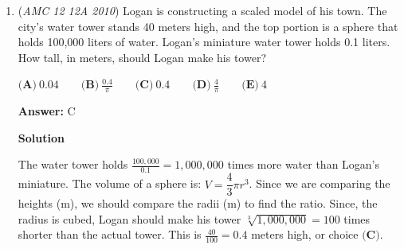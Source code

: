 \begin{enumerate}
 \textbf{Answer: }E



\textbf{Solution 1}

$x$ is at most $999$, so $x+32$ is at most $1031$. The minimum value of $x+32$ is $1000$. However, the only palindrome between $1000$ and $1032$ is $1001$, which means that $x+32$ must be $1001$.

 It follows that $x$ is $969$, so the sum of the digits is $\boxed{\textbf{(E)}\ 24}$.

 



\textbf{Solution 2}

For $x+32$ to be a four-digit number, $x$ is in between $968$ and $999$. The palindromes in this range are $969$, $979$, $989$, and $999$, so the sum of the digits of $x$ can be $24$, $25$, $26$, or $27$. Only $\boxed{\textbf{(E)}\ 24}$ is an option, and upon checking, $x+32=1001$ is indeed a palindrome.

 



\textbf{Solution 3}

Since we know $x+32$ to be $1 a a 1$ and the only palindrome that works is $0 = a$, that means $x+32 = 1001$, and so $x = 1001 - 32 = 969$. So, $9$ + $6$ + $9$ = $\boxed{\textbf{(E)}\ 24}$.~songmath20

 


	\item (\textit{AMC 12 12A 2010}) Logan is constructing a scaled model of his town. The city's water tower stands 40 meters high, and the top portion is a sphere that holds 100,000 liters of water. Logan's miniature water tower holds 0.1 liters. How tall, in meters, should Logan make his tower?


 $\textbf{(A)}\ 0.04 \qquad \textbf{(B)}\ \frac{0.4}{\pi} \qquad \textbf{(C)}\ 0.4 \qquad \textbf{(D)}\ \frac{4}{\pi} \qquad \textbf{(E)}\ 4$

 \textbf{Answer: }C



\textbf{Solution}

The water tower holds $\frac{100,000}{0.1} = 1,000,000$ times more water than Logan's miniature. The volume of a sphere is: $V=\dfrac{4}{3}\pi r^3$. Since we are comparing the heights (m), we should compare the radii (m) to find the ratio. Since, the radius is cubed, Logan should make his tower $\sqrt[3]{1,000,000} = 100$ times shorter than the actual tower. This is $\frac{40}{100} = \boxed{0.4}$ meters high, or choice $\textbf{(C)}$.


\end{enumerate}
